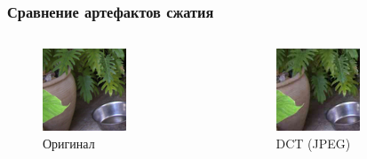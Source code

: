 \documentclass{beamer}
\begin{document}
\begin{frame}
\frametitle{Сравнение артефактов сжатия}

\begin{columns}[T]
  \begin{column}{0.3\textwidth}
    \begin{figure}
      \includegraphics[width=\textwidth]{img/field/orig}
      \caption{Оригинал}
    \end{figure}
  \end{column}

  \begin{column}{0.3\textwidth}
    \begin{figure}
      \includegraphics[width=\textwidth]{img/field/jpeg}
      \caption{DCT (JPEG)}
    \end{figure}
  \end{column}


\end{columns}
\end{frame}
\end{document}
